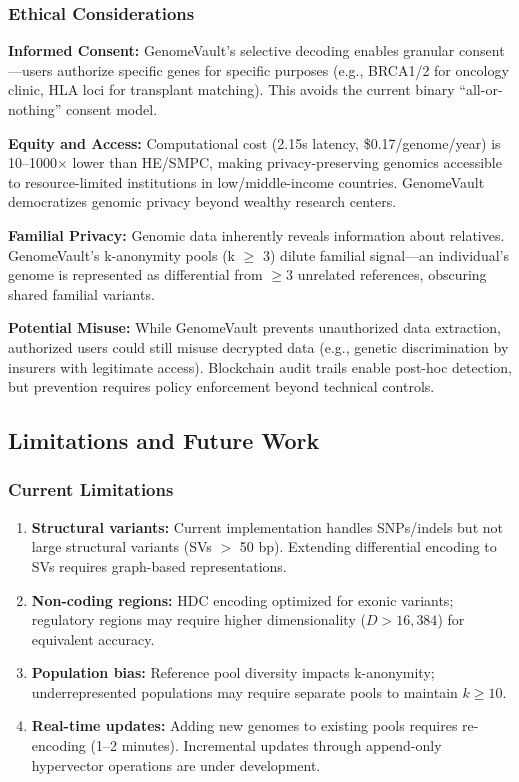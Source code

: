 \documentclass[12pt,a4paper]{article}
\begin{document}
\subsubsection{Ethical Considerations}

\textbf{Informed Consent:} GenomeVault's selective decoding enables granular consent---users authorize specific genes for specific purposes (e.g., BRCA1/2 for oncology clinic, HLA loci for transplant matching). This avoids the current binary ``all-or-nothing'' consent model.

\textbf{Equity and Access:} Computational cost (2.15s latency, \$0.17/genome/year) is 10--1000$\times$ lower than HE/SMPC, making privacy-preserving genomics accessible to resource-limited institutions in low/middle-income countries. GenomeVault democratizes genomic privacy beyond wealthy research centers.

\textbf{Familial Privacy:} Genomic data inherently reveals information about relatives. GenomeVault's k-anonymity pools (k $\geq$ 3) dilute familial signal---an individual's genome is represented as differential from $\geq$3 unrelated references, obscuring shared familial variants.

\textbf{Potential Misuse:} While GenomeVault prevents unauthorized data extraction, authorized users could still misuse decrypted data (e.g., genetic discrimination by insurers with legitimate access). Blockchain audit trails enable post-hoc detection, but prevention requires policy enforcement beyond technical controls.

\subsection{Limitations and Future Work}

\subsubsection{Current Limitations}

\begin{enumerate}
\item \textbf{Structural variants:} Current implementation handles SNPs/indels but not large structural variants (SVs $>$ 50 bp). Extending differential encoding to SVs requires graph-based representations.

\item \textbf{Non-coding regions:} HDC encoding optimized for exonic variants; regulatory regions may require higher dimensionality ($D > 16,384$) for equivalent accuracy.

\item \textbf{Population bias:} Reference pool diversity impacts k-anonymity; underrepresented populations may require separate pools to maintain $k \geq 10$.

\item \textbf{Real-time updates:} Adding new genomes to existing pools requires re-encoding (1--2 minutes). Incremental updates through append-only hypervector operations are under development.
\end{enumerate}
\end{document}

